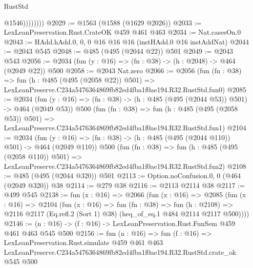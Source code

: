 \begin{lexlean}{RustStd}
\begin{coremodule}
                    @1546))))))))
@2029 := @1563 (@1588 (@1629 @2026))
@2033 := LexLeanPreservation.Rust.CrateOK @459 @461 @463
@2034 := Nat.casesOn.{0}
@2043 := HAdd.hAdd.{0, 0, 0} @16 @16 @16 (instHAdd.{0} @16 instAddNat)
@2044 := @2043 @545
@2048 := @485 (@495 (@2044 @22)) @501
@2049 := @2043 @543
@2056 := @2034 (fun (y : @16) => (fn : @38) -> (h : @2048) -> @464 (@2049 @22)) @500
@2058 := @2043 Nat.zero
@2066 := @2056
    (fun (fn : @38) =>
    fun (h : @485 (@495 (@2058 @22)) @501) =>
    LexLeanPreserve.C234a5476364869fb82ed4fba1f0ae194.R32.RustStd.fun0)
@2085 := @2034
    (fun (y : @16) => (fn : @38) -> (h : @485 (@495 (@2044 @53)) @501) -> @464 (@2049 @53))
    @500
    (fun (fn : @38) =>
    fun (h : @485 (@495 (@2058 @53)) @501) =>
    LexLeanPreserve.C234a5476364869fb82ed4fba1f0ae194.R32.RustStd.fun1)
@2104 := @2034
    (fun (y : @16) => (fn : @38) -> (h : @485 (@495 (@2044 @110)) @501) -> @464 (@2049 @110))
    @500
    (fun (fn : @38) =>
    fun (h : @485 (@495 (@2058 @110)) @501) =>
    LexLeanPreserve.C234a5476364869fb82ed4fba1f0ae194.R32.RustStd.fun2)
@2108 := @485 (@495 (@2044 @320)) @501
@2113 := Option.noConfusion.{0, 0} (@464 (@2049 @320)) @38
@2114 := @279 @38
@2116 := @2113 @2114 @38
@2117 := @499 @545
@2138 := fun (x : @16) =>
  @2066
    (fun (x : @16) =>
    @2085
      (fun (x : @16) =>
      @2104
        (fun (x : @16) =>
        fun (fn : @38) =>
        fun (h : @2108) =>
        @2116 @2117 (Eq.refl.{2} (Sort 1) @38) (heq_of_eq.{1} @484 @2114 @2117 @500))))
@2146 := (n : @16) -> (f : @16) -> LexLeanPreservation.Rust.FunSem @459 @461 @463 @545 @500
@2156 := fun (n : @16) =>
  fun (f : @16) =>
  LexLeanPreservation.Rust.simulate
    @459
    @461
    @463
    LexLeanPreserve.C234a5476364869fb82ed4fba1f0ae194.R32.RustStd.crate_ok
    @545
    @500
\end{coremodule}
\end{lexlean}
